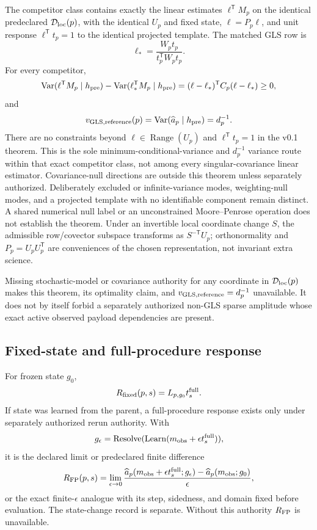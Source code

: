 The competitor class contains exactly the linear estimates $\ell^{\mathsf T}M_p$
on the identical predeclared $\mathcal{D}_{\rm loc}(p)$, with the identical $U_p$ and
fixed state, $\ell=P_p\ell$, and unit response
$\ell^{\mathsf T}t_p=1$ to the identical projected template. The matched GLS
row is
\[
 \ell_* = \frac{W_pt_p}{t_p^{\mathsf T}W_pt_p}.
\]
For every competitor,
\[
 \operatorname{Var}(\ell^{\mathsf T}M_p\mid h_{\rm pre})
 -\operatorname{Var}(\ell_*^{\mathsf T}M_p\mid h_{\rm pre})
 =(\ell-\ell_*)^{\mathsf T}C_p(\ell-\ell_*)\geq0,
\]
and
\[
 v_{{\rm GLS,reference}}(p)
 =\operatorname{Var}(\widehat a_p\mid h_{\rm pre})=d_p^{-1}.
\]
There are no constraints beyond $\ell\in\operatorname{Range}(U_p)$ and
$\ell^{\mathsf T}t_p=1$ in the v0.1 theorem. This is the sole
minimum-conditional-variance and $d_p^{-1}$ variance route within that exact
competitor class, not among every singular-covariance linear estimator.
Covariance-null directions are outside this theorem unless separately
authorized. Deliberately excluded or infinite-variance modes, weighting-null
modes, and a projected template with no identifiable component remain distinct.
A shared numerical null label or an unconstrained Moore--Penrose operation does
not establish the theorem. Under an invertible local coordinate change $S$,
the admissible row/covector subspace transforms as $S^{-\mathsf T}U_p$;
orthonormality and $P_p=U_pU_p^{\mathsf T}$ are conveniences of the chosen
representation, not invariant extra science.

Missing stochastic-model or covariance authority for any coordinate in
$\mathcal{D}_{\rm loc}(p)$ makes this theorem, its optimality claim, and
$v_{{\rm GLS,reference}}=d_p^{-1}$ unavailable. It does not by itself forbid a
separately authorized non-GLS sparse amplitude whose exact active observed
payload dependencies are present.

\subsection{Fixed-state and full-procedure response}

For frozen state $g_0$,
\[
 R_{\rm fixed}(p,s)=L_{p,g_0}t_s^{\rm full}.
\]
If state was learned from the parent, a full-procedure response exists only
under separately authorized rerun authority. With
\[
 g_\epsilon=\operatorname{Resolve}
   (\operatorname{Learn}(m_{\rm obs}+\epsilon t_s^{\rm full})),
\]
it is the declared limit or predeclared finite difference
\begin{equation}
 R_{\rm FP}(p,s)=
 \lim_{\epsilon\to0}
 \frac{\widehat a_p(m_{\rm obs}+\epsilon t_s^{\rm full};g_\epsilon)
       -\widehat a_p(m_{\rm obs};g_0)}{\epsilon},
 \label{eq:full-procedure-response}
\end{equation}
or the exact finite-$\epsilon$ analogue with its step, sidedness, and domain
fixed before evaluation. The state-change record is separate. Without this
authority $R_{\rm FP}$ is unavailable.


